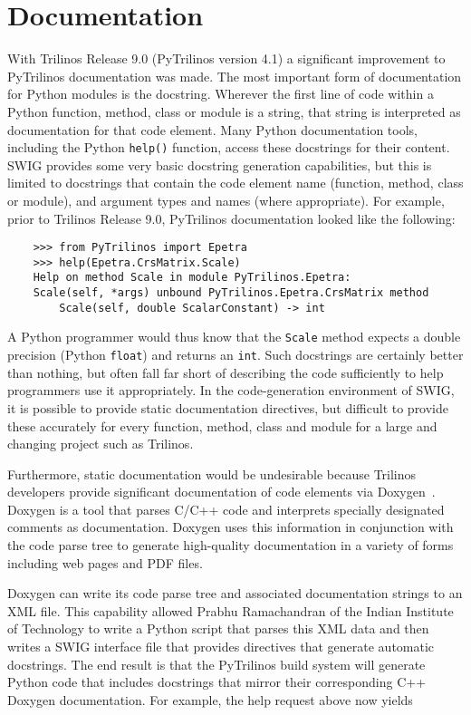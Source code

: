 \documentclass[11pt]{article}
\begin{document}
\section{Documentation}
\label{sec:documentation}

With Trilinos Release 9.0 (PyTrilinos version 4.1) a significant improvement to PyTrilinos documentation was made.  The most important form of documentation for Python modules is the docstring.  Wherever the first line of code within a Python function, method, class or module is a string, that string is interpreted as documentation for that code element.  Many Python documentation tools, including the Python {\tt help()} function, access these docstrings for their content.  SWIG provides some very basic docstring generation capabilities, but this is limited to docstrings that contain the code element name (function, method, class or module), and argument types and names (where appropriate).  For example, prior to Trilinos Release 9.0, PyTrilinos documentation looked like the following:

\begin{verbatim}
    >>> from PyTrilinos import Epetra
    >>> help(Epetra.CrsMatrix.Scale)
    Help on method Scale in module PyTrilinos.Epetra:
    Scale(self, *args) unbound PyTrilinos.Epetra.CrsMatrix method
        Scale(self, double ScalarConstant) -> int
\end{verbatim}

A Python programmer would thus know that the {\tt Scale} method expects a double precision (Python {\tt float}) and returns an {\tt int}.  Such docstrings are certainly better than nothing, but often fall far short of describing the code sufficiently to help programmers use it appropriately.  In the code-generation environment of SWIG, it is possible to provide static documentation directives, but difficult to provide these accurately for every function, method, class and module for a large and changing project such as Trilinos.

Furthermore, static documentation would be undesirable because Trilinos developers provide significant documentation of code elements via Doxygen~\cite{Doxygen}.  Doxygen is a tool that parses C/C++ code and interprets specially designated comments as documentation.  Doxygen uses this information in conjunction with the code parse tree to generate high-quality documentation in a variety of forms including web pages and PDF files.

Doxygen can write its code parse tree and associated documentation strings to an XML file.  This capability allowed Prabhu Ramachandran of the Indian Institute of Technology to write a Python script that parses this XML data and then writes a SWIG interface file that provides directives that generate automatic docstrings.  The end result is that the PyTrilinos build system will generate Python code that includes docstrings that mirror their corresponding C++ Doxygen documentation.  For example, the help request above now yields
\end{document}
